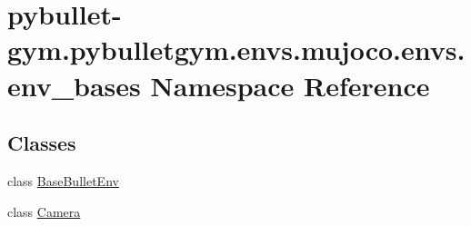 \hypertarget{namespacepybullet-gym_1_1pybulletgym_1_1envs_1_1mujoco_1_1envs_1_1env__bases}{}\section{pybullet-\/gym.pybulletgym.\+envs.\+mujoco.\+envs.\+env\+\_\+bases Namespace Reference}
\label{namespacepybullet-gym_1_1pybulletgym_1_1envs_1_1mujoco_1_1envs_1_1env__bases}
\subsection*{Classes}
\begin{DoxyCompactItemize}
\item 
class \hyperlink{classpybullet-gym_1_1pybulletgym_1_1envs_1_1mujoco_1_1envs_1_1env__bases_1_1_base_bullet_env}{Base\+Bullet\+Env}
\item 
class \hyperlink{classpybullet-gym_1_1pybulletgym_1_1envs_1_1mujoco_1_1envs_1_1env__bases_1_1_camera}{Camera}
\end{DoxyCompactItemize}
